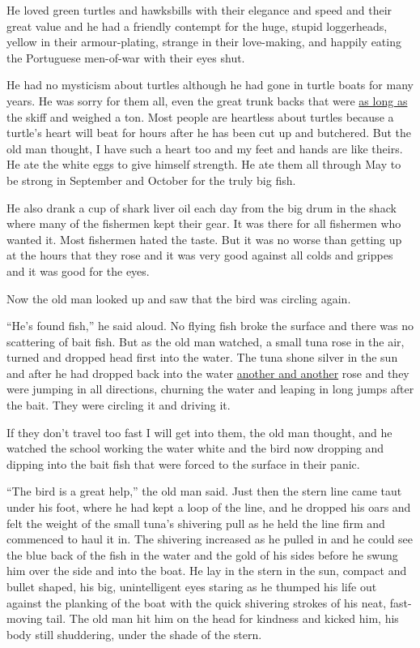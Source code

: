 He loved green turtles and \glspl{hawksbill} with their \gls{elegance} and
speed and their great value and he had a friendly \gls{contempt} for the
huge, stupid \glspl{loggerhead}, yellow in their armour-plating, strange in their
love-making, and happily eating the Portuguese men-of-war with their eyes
shut.

He had no \gls{mysticism} about turtles although he had gone in turtle boats
for many years. He was sorry for them all, even the great \gls{trunk} \gls{backs}
that were \uline{as long as} the skiff and \gls{weighed} a ton. Most people are
\gls{heartless} about turtles because a turtle's heart will beat for hours
after he has been cut up and butchered. But the old man thought, I have such
a heart too and my feet and hands are like theirs. He ate the white eggs to
give himself strength. He ate them all through May to be strong in September
and October for the truly big fish.

He also drank a cup of shark liver oil each day from the big \gls{drum} in the
shack where many of the fishermen kept their gear. It was there for all
fishermen who wanted it. Most fishermen hated the taste. But it was no worse
than getting up at the hours that they rose and it was very good against all
colds and \gls{grippes} and it was good for the eyes.

Now the old man looked up and saw that the bird was circling again.

``He's found fish,'' he said aloud. No flying fish broke the surface and there
was no \gls{scattering} of bait fish. But as the old man watched, a small tuna
rose in the air, turned and dropped head first into the water. The tuna
\gls{shone} \gls{silver} in the sun and after he had dropped back into the water
\uline{another and another} rose and they were jumping in all \glspl{direction},
\gls{churning} the water and \gls{leaping} in long jumps after the bait. They
were circling it and driving it.

If they don't travel too fast I will get into them, the old man thought, and
he watched the school working the water white and the bird now dropping and
dipping into the bait fish that were forced to the surface in their \gls{panic}.

``The bird is a great help,'' the old man said. Just then the stern line
came \gls{taut} under his foot, where he had kept a loop of the line, and he
dropped his oars and felt the weight of the small tuna's shivering
\gls{pull} as he held the line firm and \gls{commenced} to \gls{haul} it in.
The shivering increased as he pulled in and he could see the blue back of
the fish in the water and the gold of his sides before he swung him over the
side and into the boat. He lay in the stern in the sun, \gls{compact} and
\gls{bullet} shaped, his big, \gls{unintelligent} eyes staring as he
\gls{thumped} his life out against the \gls{planking} of the boat with the
quick shivering \glspl{stroke} of his \gls{neat}, fast-moving tail. The old
man hit him on the head for \gls{kindness} and kicked him, his body still
\gls{shuddering}, under the shade of the stern.

